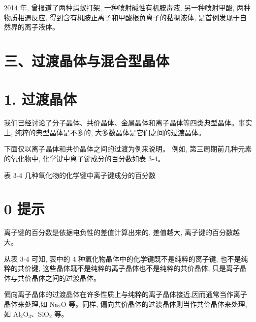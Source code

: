 \documentclass[10pt]{article}
\begin{document}
2014 年, 曾报道了两种蚂蚁打架, 一种喷射碱性有机胺毒液, 另一种喷射甲酸, 两种物质相遇反应, 得到含有机胺正离子和甲酸根负离子的黏稠液体, 是首例发现于自然界的离子液体。

\section*{三、过渡晶体与混合型晶体}

\section*{1. 过渡晶体}

我们已经讨论了分子晶体、共价晶体、金属晶体和离子晶体等四类典型晶体。事实上, 纯粹的典型晶体是不多的, 大多数晶体是它们之间的过渡晶体。

下面仅以离子晶体和共价晶体之间的过渡为例来说明。 例如, 第三周期前几种元素的氧化物中, 化学键中离子键成分的百分数如表 3-4。

表 3-4 几种氧化物的化学键中离子键成分的百分数

\begin{center}
\end{center}

\section*{0 提示}

\begin{mdframed}

离子键的百分数是依据电负性的差值计算出来的, 差值越大, 离子键的百分数越大。

\end{mdframed}

从表 3-4 可知, 表中的 4 种氧化物晶体中的化学键既不是纯粹的离子键, 也不是纯粹的共价键, 这些晶体既不是纯粹的离子晶体也不是纯粹的共价晶体, 只是离子晶体与共价晶体之间的过渡晶体。

偏向离子晶体的过渡晶体在许多性质上与纯粹的离子晶体接近,因而通常当作离子晶体来处理,如 \({\mathrm{{Na}}}_{2}\mathrm{O}\) 等。同样, 偏向共价晶体的过渡晶体则当作共价晶体来处理, 如 \({\mathrm{{Al}}}_{2}{\mathrm{O}}_{3}\text{、}{\mathrm{{SiO}}}_{2}\) 等。
\end{document}
